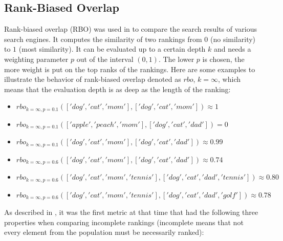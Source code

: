 \documentclass[draft,final]{thesisclass} %
\begin{document}
\subsection{Rank-Biased Overlap}
Rank-biased overlap (RBO) was used in \textcite{rank_biased_overlap} to compare the search results of various search engines.
It computes the similarity of two rankings from $0$ (no similarity) to $1$ (most similarity). It can be evaluated up to a certain depth $k$ and needs a weighting parameter $p$ out of the interval $(0,1)$.
The lower $p$ is chosen, the more weight is put on the top ranks of the rankings.
Here are some examples to illustrate the behavior of rank-biased overlap denoted as $rbo$, $k=\infty$, which means that the evaluation depth is as deep as the length of the ranking:
\begin{itemize}
    \item $rbo_{k=\infty,p=0.1}(['dog','cat','mom'],['dog','cat','mom']) \approx 1$
    \item $rbo_{k=\infty,p=0.1}(['apple','peach','mom'],['dog','cat','dad']) = 0$
    \item $rbo_{k=\infty,p=0.1}(['dog','cat','mom'],['dog','cat','dad']) \approx 0.99$
    \item $rbo_{k=\infty,p=0.6}(['dog','cat','mom'],['dog','cat','dad']) \approx 0.74$
    \item $rbo_{k=\infty,p=0.6}(['dog','cat','mom','tennis'],['dog','cat','dad','tennis']) \approx 0.80$
    \item $rbo_{k=\infty,p=0.6}(['dog','cat','mom','tennis'],['dog','cat','dad','golf']) \approx 0.78$
\end{itemize}
As described in \textcite[1]{rank_biased_overlap}, it was the first metric at that time that had the following three properties when comparing incomplete rankings (incomplete means that not every element from the population must be necessarily ranked):
\end{document}
